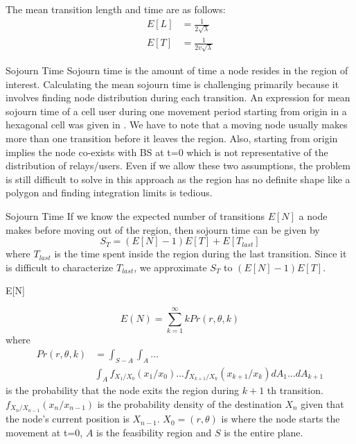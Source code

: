 \documentclass{beamer}
\begin{document}
\begin{frame}
The mean transition length and time are as follows:
\begin{align*}
	E[L] &= \frac{1}{2\sqrt{\lambda}} \\[2ex]
	E[T] &= \frac{1}{2v\sqrt{\lambda}}
\end{align*}
\end{frame}

\begin{frame}{Sojourn Time} {}
Sojourn time is the amount of time a node resides in the region of interest. Calculating the mean sojourn time is challenging primarily because it involves finding node distribution during each transition. An expression for  mean sojourn time of a cell user during one movement period starting from origin in a hexagonal cell was given in \cite{lin}. We have to note that
a moving node usually makes more than one transition before it leaves
the region. Also, starting from origin implies the node co-exists with BS at
t=0 which is not representative of the distribution of relays/users. Even if we
allow these two assumptions, the problem is still difficult to solve in this
approach as the region has no definite shape like a polygon and finding integration limits is tedious. 
\end{frame}



\begin{frame}{Sojourn Time}{}
	If we know the expected number of transitions $E[N]$ a node makes before moving out of the
region, then sojourn time can be given by
\begin{equation*}
	S_T = (E[N]-1)E[T] + E[T_{last}]
\end{equation*}
where $T_{last}$ is the time spent inside the region during the last transition.
Since it is difficult to characterize $T_{last}$, we approximate $S_T$ to $(E[N]-1)E[T]$. 
\end{frame}



\begin{frame}{E[N]}{}

\begin{equation*}
	E(N) = \sum_{k=1}^{\infty} k Pr(r,\theta,k)
\end{equation*}
where 
\begin{align*}
	Pr(r,\theta,k) &= \int_{S-A} \int_A \ldots \\ &\int_A f_{X_1/X_0}(x_1/x_0)\ldots f_{X_{k+1}/X_{k}}(x_{k+1}/x_{k}) dA_1 \ldots dA_{k+1}
\end{align*} is the probability that the node exits the region during $k+1$ th transition. 
$f_{X_n/X_{n-1}}(x_n/x_{n-1})$ is the probability density of the destination $X_n$ given that
the node's current position is $X_{n-1}$. $X_0 = (r,\theta)$ is where the node starts the  movement at t=0, $A$ is the feasibility region and $S$ is the entire plane. 
\end{frame}
\end{document}
